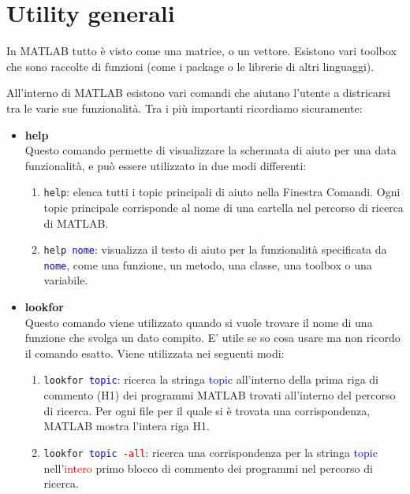 \chapter{Utility generali}
In MATLAB tutto è visto come una matrice, o un vettore. Esistono vari toolbox che sono raccolte di funzioni (come i 
package o le librerie di altri linguaggi).

All'interno di MATLAB esistono vari comandi che aiutano l'utente a districarsi tra le varie sue funzionalità.
Tra i più importanti ricordiamo sicuramente:

\begin{itemize}
	
	\item 	\textbf{help} \\ 
		  	Questo comando permette di visualizzare la schermata di aiuto per una data funzionalità, e può essere 
		  	utilizzato in due modi differenti:
		  	\begin{enumerate}
		  	
				\item	\texttt{help}: elenca tutti i topic principali di aiuto nella Finestra Comandi. Ogni topic
						principale corrisponde al nome di una cartella nel percorso di ricerca di MATLAB.
						
				\item	\texttt{help \textcolor{blue}{nome}}: visualizza il testo di aiuto per la funzionalità 
						specificata da \texttt{\textcolor{blue}{nome}}, come una funzione, un metodo, una classe, 
						una toolbox o una variabile.
		  	
		  	\end{enumerate}
		  	
	\item	\textbf{lookfor} \\
			Questo comando viene utilizzato quando si vuole trovare il nome di una funzione che svolga un dato
			compito. E' utile se so cosa usare ma non ricordo il comando esatto. Viene utilizzata nei seguenti modi:
			\begin{enumerate}
			
				\item 	\texttt{lookfor \textcolor{blue}{topic}}: ricerca la stringa \textcolor{blue}{topic}
						all'interno della prima riga di commento (H1) dei programmi MATLAB trovati all'interno del
						percorso di ricerca. Per ogni file per il quale si è trovata una corrispondenza, MATLAB
						mostra l'intera riga H1.
						
				\item 	\texttt{lookfor \textcolor{blue}{topic} \textcolor{red}{-all}}: ricerca una corrispondenza 
						per la stringa \textcolor{blue}{topic} nell'\textcolor{red}{intero} primo blocco di 
						commento dei programmi nel percorso di ricerca.
			\end{enumerate}
        

\end{itemize}
